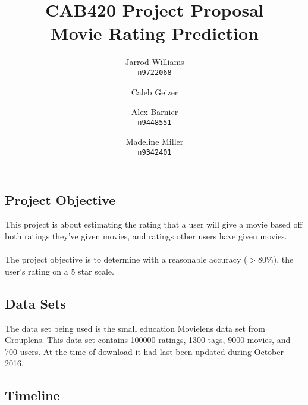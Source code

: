 \documentclass[]{report}   %
\begin{document}
\title{CAB420 Project Proposal \\ \large{Movie Rating Prediction}}   %
\author{
	Jarrod Williams\\
	\texttt{n9722068}
	\and 
	Caleb Geizer\\
	\texttt{}
	\and
	Alex Barnier\\
	\texttt{n9448551}
	\and	
	Madeline Miller\\
	\texttt{n9342401}
}
\maketitle

\subsection*{Project Objective}
This project is about estimating the rating that a user will give a movie based off both ratings they've given movies, and ratings other users have given movies.
~\\\\
The project objective is to determine with a reasonable accuracy ($>$80\%), the user's rating on a 5 star scale.
\subsection*{Data Sets}
The data set being used is the small education Movielens data set from Grouplens. This data set contains 100000 ratings, 1300 tags, 9000 movies, and 700 users. At the time of download it had last been updated during October 2016.

\subsection*{Timeline}
\end{document}

